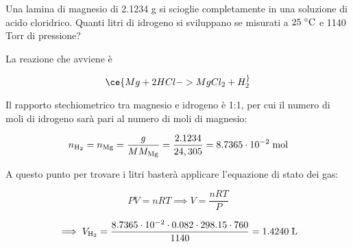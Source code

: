 \begin{esercizio}
    Una lamina di magnesio di 2.1234 g si scioglie completamente in una soluzione di acido cloridrico. Quanti litri di idrogeno si sviluppano se misurati a $25 \; ^{\circ} \rm C$ e 1140 Torr di pressione?
\end{esercizio}
\begin{soluzione}
    La reazione che avviene è

$$\ce{Mg + 2HCl -> MgCl_2 + H_2 ^}$$

Il rapporto stechiometrico tra magnesio e idrogeno è 1:1, per cui il numero di moli di idrogeno sarà pari al numero di moli di magnesio:

$$n_{\rm H_2}=n_{\rm Mg}=\frac{g}{MM_{\text{Mg}}}=\frac{2.1234}{24,305}=8.7365 \cdot 10^{-2} \; \text{mol}$$

A questo punto per trovare i litri basterà applicare l'equazione di stato dei gas:

$$PV=nRT \implies V=\frac{nRT}{P}$$

$$\implies V_{\text{H}_2}
=\frac{8.7365 \cdot 10^{-2} \cdot 0.082 \cdot 298.15 \cdot 760}{1140}
=1.4240 \; \rm L$$
\end{soluzione}

\newpage

